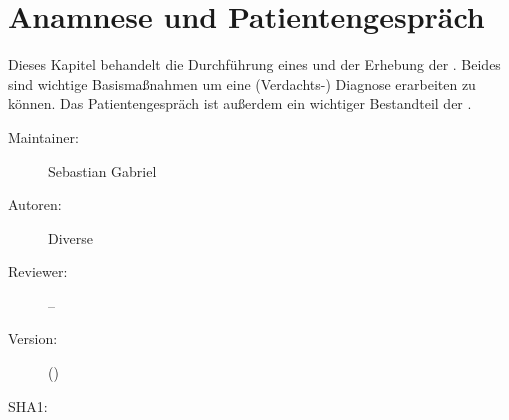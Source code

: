 \def\ChapterCode{AUP}
\chapter
[Anamnese und Patientengespräch]
{Anamnese und Patientengespräch}
\label{chp:AUU}
\label{chp:AUP}

\ChapterIntro
{%
\noindent Dieses Kapitel behandelt die Durchführung eines
 und der Erhebung der .
Beides sind wichtige Basismaßnahmen um eine (Verdachts-)
Diagnose erarbeiten zu können. Das Patientengespräch ist
außerdem ein wichtiger Bestandteil der .


}
{%
\begin{description}
  \item[Maintainer:] Sebastian Gabriel
  \item[Autoren:] Diverse
  \item[Reviewer:] --
  \item[Version:] {\DocVersion} ({\DocVersionInfo})
  \item[SHA1:] {\DocGitCommit}
\end{description}

{\TxTeilkapitelAASS}
}

% 
% 


\clearpage
% 




